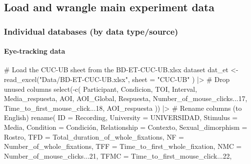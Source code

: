 \documentclass[
  bookmarksnumbered]{article}
\newenvironment{Shaded}{\begin{snugshade}}{\end{snugshade}}
\newcommand{\AttributeTok}[1]{\textcolor[rgb]{0.80,0.80,0.80}{#1}}
\newcommand{\CommentTok}[1]{\textcolor[rgb]{0.50,0.62,0.50}{#1}}
\newcommand{\DecValTok}[1]{\textcolor[rgb]{0.86,0.86,0.80}{#1}}
\newcommand{\FunctionTok}[1]{\textcolor[rgb]{0.94,0.94,0.56}{#1}}
\newcommand{\NormalTok}[1]{\textcolor[rgb]{0.80,0.80,0.80}{#1}}
\newcommand{\OtherTok}[1]{\textcolor[rgb]{0.94,0.94,0.56}{#1}}
\newcommand{\SpecialCharTok}[1]{\textcolor[rgb]{0.86,0.64,0.64}{#1}}
\newcommand{\StringTok}[1]{\textcolor[rgb]{0.80,0.58,0.58}{#1}}
\begin{document}
\subsection{Load and wrangle main experiment data}\label{load-and-wrangle-main-experiment-data}

\subsubsection{Individual databases (by data type/source)}\label{individual-databases-by-data-typesource}

\paragraph{Eye-tracking data}\label{eye-tracking-data}

\begin{Shaded}
\begin{Highlighting}[]
\CommentTok{\# Load the \textquotesingle{}CUC{-}UB\textquotesingle{} sheet from the \textquotesingle{}BD{-}ET{-}CUC{-}UB.xlsx\textquotesingle{} dataset}
\NormalTok{dat\_et }\OtherTok{\textless{}{-}} \FunctionTok{read\_excel}\NormalTok{(}\StringTok{"Data/BD{-}ET{-}CUC{-}UB.xlsx"}\NormalTok{,}
  \AttributeTok{sheet =} \StringTok{"CUC{-}UB"}
\NormalTok{) }\SpecialCharTok{|\textgreater{}}
  \CommentTok{\# Drop unused columns}
  \FunctionTok{select}\NormalTok{(}\SpecialCharTok{{-}}\FunctionTok{c}\NormalTok{(}
\NormalTok{    Participant, Condicion, TOI, Interval, Media\_respuesta, AOI,}
\NormalTok{    AOI\_Global, Respuesta, Number\_of\_mouse\_clicks...}\DecValTok{17}\NormalTok{,}
\NormalTok{    Time\_to\_first\_mouse\_click...}\DecValTok{18}\NormalTok{, AOI\_respuesta}
\NormalTok{  )) }\SpecialCharTok{|\textgreater{}}
  \CommentTok{\# Rename columns (to English)}
  \FunctionTok{rename}\NormalTok{(}
    \AttributeTok{ID =}\NormalTok{ Recording,}
    \AttributeTok{University =}\NormalTok{ UNIVERSIDAD,}
    \AttributeTok{Stimulus =}\NormalTok{ Media,}
    \AttributeTok{Condition =}\NormalTok{ Condición,}
    \AttributeTok{Relationship =}\NormalTok{ Contexto,}
    \AttributeTok{Sexual\_dimorphism =}\NormalTok{ Rostro,}
    \AttributeTok{TFD =}\NormalTok{ Total\_duration\_of\_whole\_fixations,}
    \AttributeTok{NF =}\NormalTok{ Number\_of\_whole\_fixations,}
    \AttributeTok{TFF =}\NormalTok{ Time\_to\_first\_whole\_fixation,}
    \AttributeTok{NMC =}\NormalTok{ Number\_of\_mouse\_clicks...}\DecValTok{21}\NormalTok{,}
    \AttributeTok{TFMC =}\NormalTok{ Time\_to\_first\_mouse\_click...}\DecValTok{22}\NormalTok{,}

\end{Highlighting}
\end{Shaded}
\end{document}
